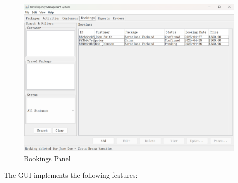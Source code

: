 \documentclass[12pt]{article}
\begin{document}
\begin{figure}[H]
\centering
\includegraphics[width=\textwidth]{gui3.png}
\caption{Bookings Panel}
\end{figure}

The GUI implements the following features:
\end{document}
